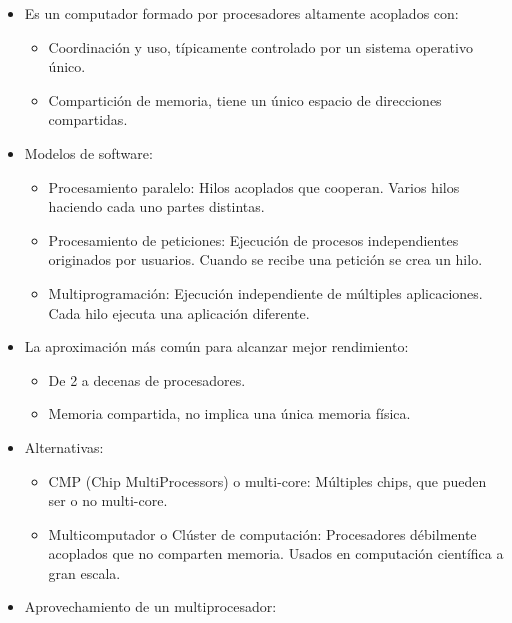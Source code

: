 \documentclass[12pt, twoside, openright]{report} %
\begin{document}
    \begin{itemize}
    \item
      Es un computador formado por procesadores altamente acoplados
      con:

      \begin{itemize}
      
      \item
        Coordinación y uso, típicamente controlado por un sistema
        operativo único.
      \item
        Compartición de memoria, tiene un único espacio de direcciones
        compartidas.
      \end{itemize}
    \item
      Modelos de software:

      \begin{itemize}
      
      \item
        Procesamiento paralelo: Hilos acoplados que cooperan. Varios
        hilos haciendo cada uno partes distintas.
      \item
        Procesamiento de peticiones: Ejecución de procesos
        independientes originados por usuarios. Cuando se recibe una
        petición se crea un hilo.
      \item
        Multiprogramación: Ejecución independiente de múltiples
        aplicaciones. Cada hilo ejecuta una aplicación diferente.
      \end{itemize}
      \pagebreak
    \item
      La aproximación más común para alcanzar mejor rendimiento:

      \begin{itemize}
      
      \item
        De 2 a decenas de procesadores.
      \item
        Memoria compartida, no implica una única memoria física.
      \end{itemize}
    \item
      Alternativas:

      \begin{itemize}
      
      \item
        CMP (Chip MultiProcessors) o multi-core: Múltiples chips, que
        pueden ser o no multi-core.
      \item
        Multicomputador o Clúster de computación: Procesadores
        débilmente acoplados que no comparten memoria. Usados en
        computación científica a gran escala.
      \end{itemize}
    \item
      Aprovechamiento de un multiprocesador:


\end{itemize}
\end{document}
